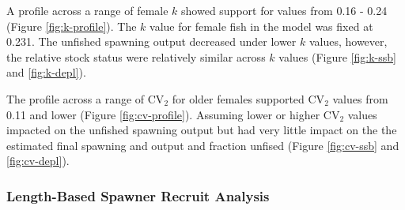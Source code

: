 \documentclass[11pt,
  english,
  a4paper,
]{article}
\begin{document}
\leavevmode\tagmcend\tagstructend\par


A profile across a range of female {\(k\)\leavevmode\tagmcend\tagstructend} showed support for values from 0.16 - 0.24 (Figure \ref{fig:k-profile}). The {\(k\)\leavevmode\tagmcend\tagstructend} value for female fish in the model was fixed at 0.231. The unfished spawning output decreased under lower {\(k\)\leavevmode\tagmcend\tagstructend} values, however, the relative stock status were relatively similar across {\(k\)\leavevmode\tagmcend\tagstructend} values (Figure \ref{fig:k-ssb} and \ref{fig:k-depl}).

\leavevmode\tagmcend\tagstructend\par


The profile across a range of {\(\text{CV}_2\)\leavevmode\tagmcend\tagstructend} for older females supported {\(\text{CV}_2\)\leavevmode\tagmcend\tagstructend} values from 0.11 and lower (Figure \ref{fig:cv-profile}). Assuming lower or higher {\(\text{CV}_2\)\leavevmode\tagmcend\tagstructend} values impacted on the unfished spawning output but had very little impact on the the estimated final spawning and output and fraction unfised (Figure \ref{fig:cv-ssb} and \ref{fig:cv-depl}).

\leavevmode\tagmcend\tagstructend\par


\hypertarget{length-based-spawner-recruit-analysis}{%
\subsubsection{Length-Based Spawner Recruit Analysis}\label{length-based-spawner-recruit-analysis}}

\leavevmode\tagmcend\tagstructend

\end{document}
